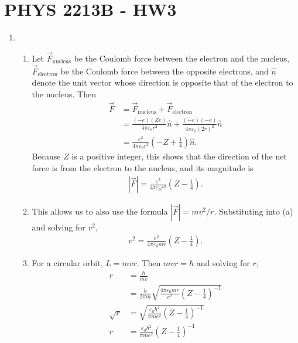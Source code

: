 \documentclass[a4paper,12pt]{article}
\begin{document}
\section*{PHYS 2213B - HW3}

\begin{enumerate}
    \item
        \begin{enumerate}
            \item
                Let $\vec{F}_{\text{nucleus}}$ be the Coulomb force between the electron and the nucleus, $\vec{F}_{\text{electron}}$ be the Coulomb force between the opposite electrons, and $\hat{n}$ denote the unit vector whose direction is opposite that of the electron to the nucleus. Then
                \begin{align*}
                    \vec{F} &= \vec{F}_{\text{nucleus}} + \vec{F}_{\text{electron}} \\
                    &= \frac{(-e)(Ze)}{4\pi \varepsilon_0 r^2} \hat{n} + \frac{(-e)(-e)}{4\pi \varepsilon_0 (2r)^2} \hat{n} \\
                    &= \frac{e^2}{4\pi \varepsilon_0 r^2} \left( -Z + \frac{1}{4} \right) \hat{n}.
                \end{align*}
                Because $Z$ is a positive integer, this shows that the direction of the net force is from the electron to the nucleus, and its magnitude is
                \begin{align*}
                    |\vec{F}| = \frac{e^2}{4\pi \varepsilon_0 r^2} \left( Z - \frac{1}{4} \right).
                \end{align*}

            \item
                This allows us to also use the formula $|\vec{F}| = mv^2 / r$. Substituting into (a) and solving for $v^2$,
                \begin{align*}
                    v^2 = \frac{e^2}{4\pi \varepsilon_0 m r} \left( Z - \frac{1}{4} \right).
                \end{align*}

            \item
                For a circular orbit, $L = mvr$. Then $mvr = \hbar$ and solving for $r$,
                \begin{align*}
                    r &= \frac{\hbar}{mv} \\
                    &= \frac{h}{2 \pi m} \sqrt{ \frac{4 \pi \varepsilon_0 m r}{e^2} \left( Z - \frac{1}{4} \right)^{-1}} \\
                    \sqrt{r} &= \sqrt{\frac{\varepsilon_0 h^2}{\pi m e^2} \left( Z - \frac{1}{4} \right)^{-1}} \\
                    r &= \frac{\varepsilon_0 h^2}{\pi m e^2} \left( Z - \frac{1}{4} \right)^{-1}
                \end{align*}


\end{enumerate}
\end{enumerate}
\end{document}
